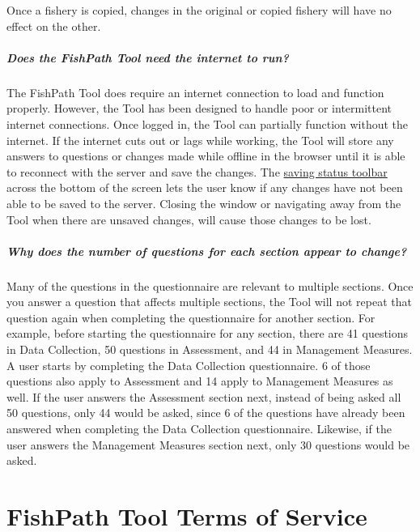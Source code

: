 \documentclass[
  11pt,
]{book}
\begin{document}
Once a fishery is copied, changes in the original or copied fishery will have no effect on the other.

\hypertarget{faq-internet}{%
\paragraph{Does the FishPath Tool need the internet to run?}\label{faq-internet}}

The FishPath Tool does require an internet connection to load and function properly. However, the Tool has been designed to handle poor or intermittent internet connections. Once logged in, the Tool can partially function without the internet. If the internet cuts out or lags while working, the Tool will store any answers to questions or changes made while offline in the browser until it is able to reconnect with the server and save the changes. The \protect\hyperlink{saving-status-toolbar}{saving status toolbar} across the bottom of the screen lets the user know if any changes have not been able to be saved to the server. Closing the window or navigating away from the Tool when there are unsaved changes, will cause those changes to be lost.

\hypertarget{faq-question-numbering}{%
\paragraph{Why does the number of questions for each section appear to change?}\label{faq-question-numbering}}

Many of the questions in the questionnaire are relevant to multiple sections. Once you answer a question that affects multiple sections, the Tool will not repeat that question again when completing the questionnaire for another section. For example, before starting the questionnaire for any section, there are 41 questions in Data Collection, 50 questions in Assessment, and 44 in Management Measures. A user starts by completing the Data Collection questionnaire. 6 of those questions also apply to Assessment and 14 apply to Management Measures as well. If the user answers the Assessment section next, instead of being asked all 50 questions, only 44 would be asked, since 6 of the questions have already been answered when completing the Data Collection questionnaire. Likewise, if the user answers the Management Measures section next, only 30 questions would be asked.

\hypertarget{terms}{%
\chapter{FishPath Tool Terms of Service}\label{terms}}
\end{document}

